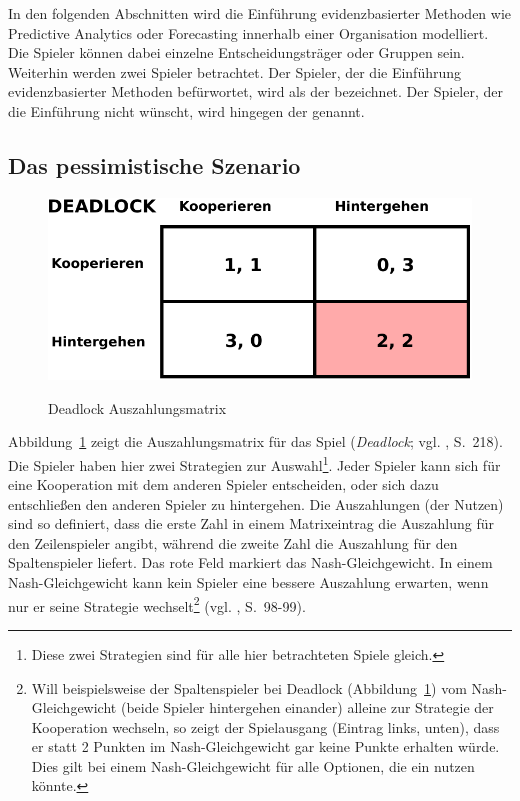 {In den folgenden Abschnitten wird die Einführung evidenzbasierter Methoden wie Predictive Analytics oder Forecasting innerhalb einer
Organisation modelliert. Die Spieler können dabei einzelne Entscheidungsträger oder Gruppen sein. Weiterhin werden zwei Spieler
betrachtet. Der Spieler, der die Einführung evidenzbasierter Methoden befürwortet, wird als der \grqq{}
bezeichnet. Der Spieler, der die Einführung nicht wünscht, wird hingegen der \grqq{} genannt.  

\subsection{Das pessimistische Szenario}

\begin{figure}%
\centering
\caption{Deadlock Auszahlungsmatrix}
\includegraphics[scale=0.8]{Grafiken/Deadlock_Ink.pdf} 
\label{pic:Deadlock}
\end{figure}

Abbildung~\ref{pic:Deadlock} zeigt die Auszahlungsmatrix für das Spiel \grqq{}
(\emph{Deadlock}; vgl. \cite{Poundstone}, S.~218). Die Spieler haben hier zwei Strategien zur Auswahl\footnote{
Diese zwei Strategien sind für alle hier betrachteten Spiele gleich.
}. Jeder Spieler kann sich für eine Kooperation mit dem anderen Spieler entscheiden, oder sich dazu entschließen
den anderen Spieler zu hintergehen. Die Auszahlungen (der Nutzen) sind so definiert, dass die erste Zahl in einem Matrixeintrag
die Auszahlung für den Zeilenspieler angibt, während die zweite Zahl die Auszahlung für den Spaltenspieler liefert.
Das rote Feld markiert das Nash-Gleichgewicht. In einem Nash-Gleichgewicht kann kein Spieler eine bessere Auszahlung erwarten, wenn
nur er seine Strategie wechselt\footnote{
Will beispielsweise der Spaltenspieler bei Deadlock (Abbildung~\ref{pic:Deadlock}) vom Nash-Gleichgewicht (beide Spieler hintergehen
einander) alleine zur Strategie der Kooperation wechseln, so zeigt der Spielausgang (Eintrag links, unten), dass er statt 2 Punkten
im Nash-Gleichgewicht gar keine Punkte erhalten würde. Dies gilt bei einem Nash-Gleichgewicht für alle Optionen, die ein
\grqq{} nutzen könnte.
} (vgl. \cite{Poundstone}, S.~98-99).

}
